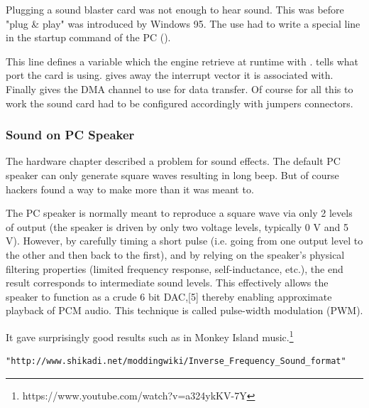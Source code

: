  Plugging a sound blaster card was not enough to hear sound. This was before "plug \& play" was introduced by Windows 95. The use had to write a special line in the startup command of the PC ().\\
\par 
\begin{minipage}{\textwidth}

\end{minipage}
\par
This line defines a variable  which the engine retrieve at runtime with .  tells what port the card is using.  gives away the interrupt vector it is associated with. Finally  gives the DMA channel to use for data transfer. Of course for all this to work the sound card had to be configured accordingly with jumpers connectors.

 
\subsubsection{Sound on PC Speaker}
The hardware chapter described a problem for sound effects. The default PC speaker can only generate square waves resulting in long beep. But of course hackers found a way to make more than it was meant to.

\par
 \begin{fancyquotes}
  The PC speaker is normally meant to reproduce a square wave via only 2 levels of output (the speaker is driven by only two voltage levels, typically 0 V and 5 V). However, by carefully timing a short pulse (i.e. going from one output level to the other and then back to the first), and by relying on the speaker's physical filtering properties (limited frequency response, self-inductance, etc.), the end result corresponds to intermediate sound levels. This effectively allows the speaker to function as a crude 6 bit DAC,[5] thereby enabling approximate playback of PCM audio. This technique is called pulse-width modulation (PWM).
 \end{fancyquotes}
\par
  It gave surprisingly good results such as in Monkey Island music.\footnote{https://www.youtube.com/watch?v=a324ykKV-7Y}\\
  \par

\begin{verbatim}
"http://www.shikadi.net/moddingwiki/Inverse_Frequency_Sound_format"
\end{verbatim}





